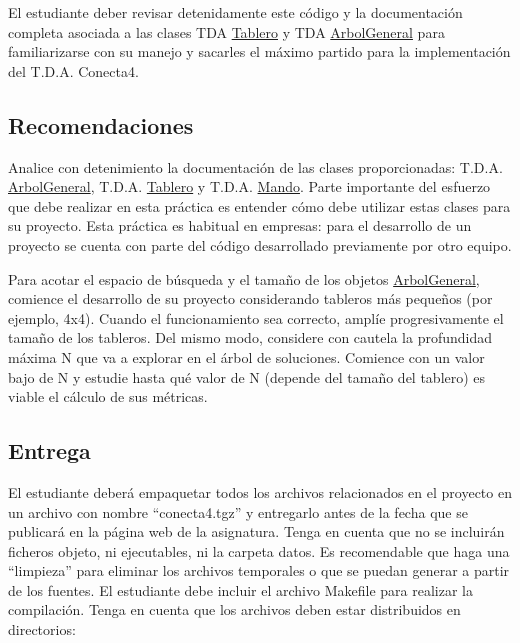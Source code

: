 El estudiante deber revisar detenidamente este código y la documentación completa asociada a las clases T\+DA \hyperlink{classTablero}{Tablero} y T\+DA \hyperlink{classArbolGeneral}{Arbol\+General} para familiarizarse con su manejo y sacarles el máximo partido para la implementación del T.\+D.\+A. Conecta4.\hypertarget{index_recomendaciones}{}\subsection{Recomendaciones}\label{index_recomendaciones}

\begin{DoxyItemize}
\item Analice con detenimiento la documentación de las clases proporcionadas\+: T.\+D.\+A. \hyperlink{classArbolGeneral}{Arbol\+General}, T.\+D.\+A. \hyperlink{classTablero}{Tablero} y T.\+D.\+A. \hyperlink{classMando}{Mando}. Parte importante del esfuerzo que debe realizar en esta práctica es entender cómo debe utilizar estas clases para su proyecto. Esta práctica es habitual en empresas\+: para el desarrollo de un proyecto se cuenta con parte del código desarrollado previamente por otro equipo.
\item Para acotar el espacio de búsqueda y el tamaño de los objetos \hyperlink{classArbolGeneral}{Arbol\+General}, comience el desarrollo de su proyecto considerando tableros más pequeños (por ejemplo, 4x4). Cuando el funcionamiento sea correcto, amplíe progresivamente el tamaño de los tableros. Del mismo modo, considere con cautela la profundidad máxima N que va a explorar en el árbol de soluciones. Comience con un valor bajo de N y estudie hasta qué valor de N (depende del tamaño del tablero) es viable el cálculo de sus métricas.
\end{DoxyItemize}\hypertarget{index_entrega}{}\subsection{Entrega}\label{index_entrega}
El estudiante deberá empaquetar todos los archivos relacionados en el proyecto en un archivo con nombre “conecta4.\+tgz” y entregarlo antes de la fecha que se publicará en la página web de la asignatura. Tenga en cuenta que no se incluirán ficheros objeto, ni ejecutables, ni la carpeta datos. Es recomendable que haga una “limpieza” para eliminar los archivos temporales o que se puedan generar a partir de los fuentes. El estudiante debe incluir el archivo Makefile para realizar la compilación. Tenga en cuenta que los archivos deben estar distribuidos en directorios\+:


